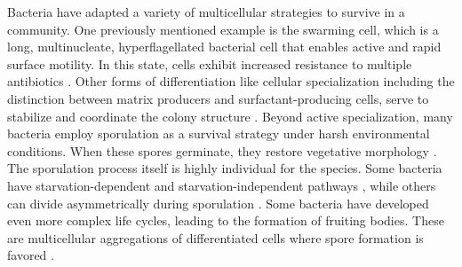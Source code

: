 Bacteria have adapted a variety of multicellular strategies to survive in a community.
One previously mentioned example is the swarming cell, which is a long, multinucleate,
hyperflagellated bacterial cell that enables active and rapid surface motility. In this
state, cells exhibit increased resistance to multiple antibiotics \cite{Kim2003,
Lai2009}. Other forms of differentiation like cellular specialization including the
distinction between matrix producers and surfactant-producing cells, serve to stabilize
and coordinate the colony structure \cite{Lopez2010, Flemming2016}.
Beyond active specialization, many bacteria employ sporulation as a survival strategy
under harsh environmental conditions. When these spores germinate, they restore
vegetative morphology \cite{Huan2021, Errington2020, Licking2000, Barák2019, Jose2016,
Branda2001}. The sporulation process itself is highly individual for the species. Some
bacteria have starvation-dependent and starvation-independent pathways
\cite{Licking2000}, while others can divide asymmetrically during sporulation
\cite{Barák2019}. Some bacteria have developed even more complex life cycles, leading to
the formation of fruiting bodies. These are multicellular aggregations of differentiated
cells where spore formation is favored \cite{Licking2000, Jose2016, Branda2001}.

